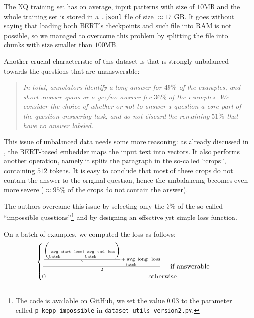 \documentclass[10pt,hidelinks]{article}
\DeclareMathOperator*{\avg}{avg}
\begin{document}


The NQ training set has on average, input patterns with size of $10$MB and the whole training set is stored in a \texttt{.jsonl} file of size $\approx 17$ GB.
It goes without saying that loading both BERT's checkpoints and such file into RAM is not possible, so we managed to overcome this problem by splitting the file into chunks with size smaller than $100$MB.

Another crucial characteristic of this dataset is that is strongly unbalanced towards the questions that are unanswerable:
\blockquote{\it In total, annotators identify a long answer for $49\%$ of the examples, and short answer spans or a yes/no answer for $36\%$ of the examples. We consider the choice of whether or not to answer a question a core part of the question answering task, and do not discard the remaining $51\%$ that have no answer labeled.\cite{kwiatowski}}
	
This issue of unbalanced data needs some more reasoning: as already discussed in , the BERT-based embedder maps the input text into vectors. It also performs another operation, namely it splits the paragraph in the so-called ``crops'', containing $512$ tokens.
It is easy to conclude that most of these crops do not contain the answer to the original question, hence the umbalancing becomes even more severe ($\approx 95\%$ of the crops do not contain the answer).

The authors overcame this issue by selecting only the $3\%$ of the so-called ``impossible questions''\footnote{The code is available on GitHub, we set the value $0.03$ to the parameter called \texttt{p\_kepp\_impossible} in \texttt{dataset\_utils\_version2.py}.} and by designing an effective yet simple loss function.


On a batch of examples, we computed the loss as follows:
\[
\begin{cases}
\frac{\frac{\biggl ( \avg\limits_{\text{batch}} \text{start\_loss} + \avg\limits_{\text{batch}} \text{end\_loss}  \biggr )}{2} + \avg\limits_{\text{batch}} \text{long\_loss}}{2} \hspace{0.5cm}\text{if answerable}\\
0 \hspace{5.3cm} \text{otherwise}
\end{cases}
\]
 
\end{document}
